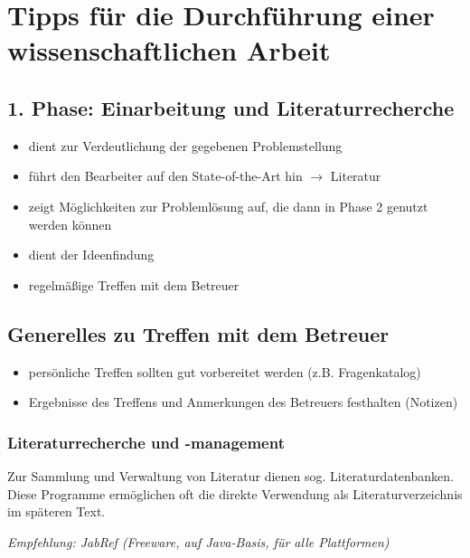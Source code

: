 \chapter{Tipps für die Durchführung einer wissenschaftlichen Arbeit}
\label{cha:Hinweise}
%
%
\section*{1. Phase: Einarbeitung und Literaturrecherche}
\label{sec:Einarbeitung}
\begin{itemize}
	\item dient zur Verdeutlichung der gegebenen Problemstellung
	\item führt den Bearbeiter auf den \glqq{}State-of-the-Art\grqq{} hin $\rightarrow$ Literatur
	\item zeigt Möglichkeiten zur Problemlösung auf, die dann in Phase 2 genutzt werden können
	\item dient der Ideenfindung
	\item regelmäßige Treffen mit dem Betreuer
\end{itemize}


\section*{Generelles zu Treffen mit dem Betreuer}
\label{sec:TreffenBetreuer}
\begin{itemize}
	\item persönliche Treffen sollten gut vorbereitet werden (z.B. Fragenkatalog)
	\item Ergebnisse des Treffens und Anmerkungen des Betreuers festhalten (Notizen)
\end{itemize}


\subsection*{Literaturrecherche und -management}
\label{sec:Literaturrecherche}
Zur Sammlung und Verwaltung von Literatur dienen sog. Literaturdatenbanken. Diese Programme ermöglichen oft die direkte Verwendung als Literaturverzeichnis im späteren Text.

\emph{Empfehlung: JabRef (Freeware, auf Java-Basis, für alle Plattformen)}

